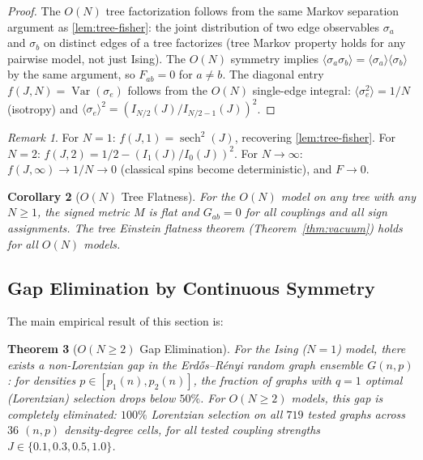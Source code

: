 \documentclass[11pt]{article}
\newtheorem{theorem}{Theorem}[section]
\newtheorem{corollary}[theorem]{Corollary}
\theoremstyle{definition}
\theoremstyle{remark}
\newtheorem{remark}[theorem]{Remark}
\newcommand{\Fish}{F}
\newcommand{\Met}{M}
\newcommand{\Var}{\operatorname{Var}}
\newcommand{\sech}{\operatorname{sech}}
\newcommand{\edgeo}{\sigma}
\newcommand{\Ein}{G}
\begin{document}
\begin{proof}
The $O(N)$ tree factorization follows from the same Markov separation
argument as \cref{lem:tree-fisher}: the joint distribution of two
edge observables $\edgeo_a$ and $\edgeo_b$ on distinct edges of a
tree factorizes (tree Markov property holds for any pairwise model,
not just Ising). The $O(N)$ symmetry implies
$\langle \edgeo_a \edgeo_b \rangle = \langle \edgeo_a \rangle
\langle \edgeo_b \rangle$ by the same argument, so
$\Fish_{ab} = 0$ for $a \neq b$.
The diagonal entry $f(J, N) = \Var(\edgeo_e)$ follows from the $O(N)$
single-edge integral:
$\langle \edgeo_e^2 \rangle = 1/N$ (isotropy) and
$\langle \edgeo_e \rangle^2 = (I_{N/2}(J)/I_{N/2-1}(J))^2$.
\end{proof}

\begin{remark}
For $N = 1$: $f(J, 1) = \sech^2(J)$, recovering \cref{lem:tree-fisher}.
For $N = 2$: $f(J, 2) = 1/2 - (I_1(J)/I_0(J))^2$.
For $N \to \infty$: $f(J, \infty) \to 1/N \to 0$ (classical spins
become deterministic), and $\Fish \to 0$.
\end{remark}

\begin{corollary}[$O(N)$ Tree Flatness]
\label{cor:on-tree-flat}
For the $O(N)$ model on any tree with any $N \geq 1$, the signed
metric $\Met$ is flat and $\Ein_{ab} = 0$ for all couplings and all
sign assignments. The tree Einstein flatness theorem
(Theorem~\ref{thm:vacuum}) holds for all $O(N)$ models.
\end{corollary}

\subsection{Gap Elimination by Continuous Symmetry}
\label{subsec:gap-elimination}

The main empirical result of this section is:

\begin{theorem}[$O(N \geq 2)$ Gap Elimination]
\label{thm:on-gap}
For the Ising ($N = 1$) model, there exists a non-Lorentzian gap in
the Erd\H{o}s--R\'enyi random graph ensemble $G(n, p)$: for densities
$p \in [p_1(n), p_2(n)]$, the fraction of graphs with $q = 1$ optimal
(Lorentzian) selection drops below $50\%$. For $O(N \geq 2)$ models,
this gap is completely eliminated: $100\%$ Lorentzian selection on
all $719$ tested graphs across $36$ $(n, p)$ density-degree cells,
for all tested coupling strengths $J \in \{0.1, 0.3, 0.5, 1.0\}$.
\end{theorem}
\end{document}
